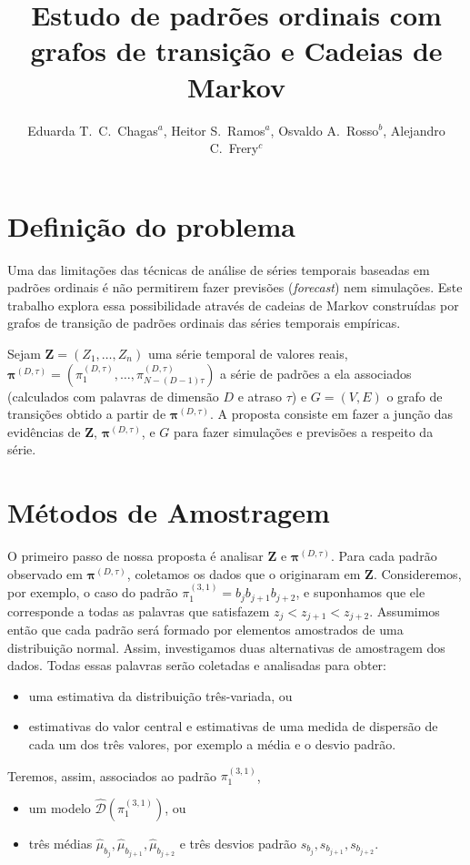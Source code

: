 \documentclass[10pt]{article}
\title{Estudo de padrões ordinais com grafos de transição e Cadeias de Markov}
\author{
	Eduarda T.\ C.\ Chagas$^a$,
	Heitor S.\ Ramos$^a$,
	Osvaldo A.\ Rosso$^b$,
	Alejandro C.\ Frery$^c$
}
\begin{document}
\maketitle

\section*{Definição do problema} \label{abstract}

Uma das limitações das técnicas de análise de séries temporais baseadas em padrões ordinais é não permitirem fazer previsões (\textit{forecast}) nem simulações.
Este trabalho explora essa possibilidade através de cadeias de Markov construídas por grafos de transição de padrões ordinais das séries temporais empíricas.

Sejam $\bm Z=(Z_1,\dots,Z_n)$ uma série temporal de valores reais,
$\bm \pi^{(D,\tau)} = (\pi^{(D,\tau)}_1,\dots,\pi^{(D,\tau)}_{N-(D-1)\tau})$ a série de padrões a ela associados (calculados com palavras de dimensão $D$ e atraso $\tau$) e $G=(V,E)$ o grafo de transições obtido a partir de $\bm \pi^{(D,\tau)}$.
A proposta consiste em fazer a junção das evidências de $\bm Z$, $\bm \pi^{(D,\tau)}$, e $G$ para fazer simulações e previsões a respeito da série.

\section*{Métodos de Amostragem} \label{sampling}

O primeiro passo de nossa proposta é analisar $\bm Z$ e $\bm \pi^{(D,\tau)}$.
Para cada padrão observado em $\bm \pi^{(D,\tau)}$, coletamos os dados que o originaram em $\bm Z$.
Consideremos, por exemplo, o caso do padrão $\pi^{(3,1)}_1=b_{j}b_{j+1}b_{j+2}$, e suponhamos que ele corresponde a todas as palavras que satisfazem $z_{j}<z_{j+1}<z_{j+2}$.
Assumimos então que cada padrão será formado por elementos amostrados de uma distribuição normal.
Assim, investigamos duas alternativas de amostragem dos dados.
Todas essas palavras serão coletadas e analisadas para obter:
\begin{itemize}
	\item uma estimativa da distribuição três-variada, ou
	\item estimativas do valor central e estimativas de uma medida de dispersão de cada um dos três valores, por exemplo a média e o desvio padrão.
\end{itemize} 
Teremos, assim, associados ao padrão $\pi^{(3,1)}_1$, 
\begin{itemize}
	\item um modelo $\widehat{\mathcal{D}}(\pi^{(3,1)}_1)$, ou
	\item três médias $\widehat\mu_{b_j}, \widehat\mu_{b_{j+1}}, \widehat\mu_{b_{j+2}}$ e três desvios padrão $s_{b_j}, s_{b_{j+1}}, s_{b_{j+2}}$.
\end{itemize} 
\end{document}
